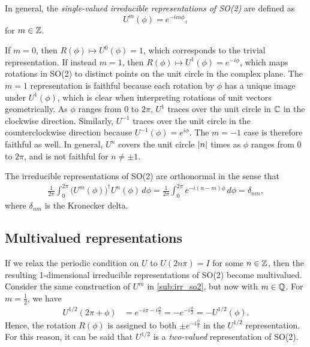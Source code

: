 In general, the \textit{single-valued irreducible representations of SO(2)} are defined as
\begin{equation}
    U^m(\phi) = e^{-im\phi},
\end{equation}
for $m\in\mathbb{Z}$.

If $m=0$, then $R(\phi)\mapsto U^0(\phi) = 1$, which corresponds to the trivial representation. If instead $m=1$, then $R(\phi)\mapsto U^1(\phi) = e^{-i\phi}$, which maps rotations in SO(2) to distinct points on the unit circle in the complex plane. The $m=1$ representation is faithful because each rotation by $\phi$ has a unique image under $U^1(\phi)$, which is clear when interpreting rotations of unit vectors geometrically. As $\phi$ ranges from 0 to $2\pi$, $U^1$ traces over the unit circle in $\mathbb{C}$ in the clockwise direction. Similarly, $U^{-1}$ traces over the unit circle in the counterclockwise direction because $U^{-1}(\phi)=e^{i\phi}$. The $m=-1$ case is therefore faithful as well. In general, $U^n$ covers the unit circle $\left|n\right|$ times as $\phi$ ranges from 0 to $2\pi$, and is not faithful for $n\neq\pm1$.

The irreducible representations of SO(2) are orthonormal in the sense that
\begin{align*}
    \frac{1}{2\pi}\int_{0}^{2\pi}{\bigl(U^m(\phi)\bigr)}^\dagger U^n(\phi) \,d\phi = \frac{1}{2\pi}\int_{0}^{2\pi} e^{-i(n-m)\phi} \,d\phi = \delta_{nm},
\end{align*}
where $\delta_{nm}$ is the Kronecker delta.

\subsection{Multivalued representations}\label{sub:multi_so2}
If we relax the periodic condition on $U$ to $U(2n\pi) = I$ for some $n\in\mathbb{Z}$, then the resulting 1-dimensional irreducible representations of SO(2) become multivalued. Consider the same construction of $U^m$ in \cref{sub:irr_so2}, but now with $m\in\mathbb{Q}$. For $m=\frac{1}{2}$, we have
\begin{align*}
    U^{1/2}(2\pi + \phi) &= e^{-i\pi - i\frac{\phi}{2}} = -e^{-i\frac{\phi}{2}} = -U^{1/2}(\phi).
\end{align*}
Hence, the rotation $R(\phi)$ is assigned to both $\pm e^{-i\frac{\phi}{2}}$ in the $U^{1/2}$ representation. For this reason, it can be said that $U^{1/2}$ is a \textit{two-valued} representation of SO(2).

